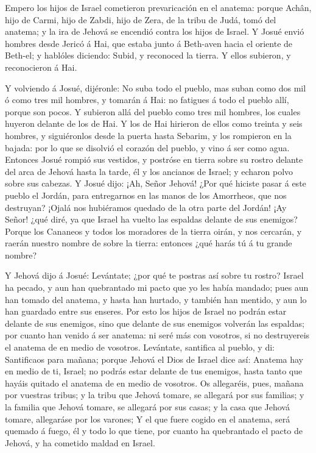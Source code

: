  Empero los hijos de Israel cometieron prevaricación en el
anatema: porque Achân, hijo de Carmi, hijo de Zabdi, hijo de Zera, de la
tribu de Judá, tomó del anatema; y la ira de Jehová se encendió contra
los hijos de Israel.  Y Josué envió hombres desde Jericó á
Hai, que estaba junto á Beth-aven hacia el oriente de Beth-el; y
hablóles diciendo: Subid, y reconoced la tierra. Y ellos subieron, y
reconocieron á Hai.

 Y volviendo á Josué, dijéronle: No suba todo el pueblo, mas
suban como dos mil ó como tres mil hombres, y tomarán á Hai: no fatigues
á todo el pueblo allí, porque son pocos.  Y subieron allá
del pueblo como tres mil hombres, los cuales huyeron delante de los de
Hai.  Y los de Hai hirieron de ellos como treinta y seis
hombres, y siguiéronlos desde la puerta hasta Sebarim, y los rompieron
en la bajada: por lo que se disolvió el corazón del pueblo, y vino á ser
como agua.  Entonces Josué rompió sus vestidos, y postróse
en tierra sobre su rostro delante del arca de Jehová hasta la tarde, él
y los ancianos de Israel; y echaron polvo sobre sus cabezas.
 Y Josué dijo: ¡Ah, Señor Jehová! ¿Por qué hiciste pasar á
este pueblo el Jordán, para entregarnos en las manos de los Amorrheos,
que nos destruyan? ¡Ojalá nos hubiéramos quedado de la otra parte del
Jordán!  ¡Ay Señor! ¿qué diré, ya que Israel ha vuelto las
espaldas delante de sus enemigos?  Porque los Cananeos y
todos los moradores de la tierra oirán, y nos cercarán, y raerán nuestro
nombre de sobre la tierra: entonces ¿qué harás tú á tu grande nombre?

 Y Jehová dijo á Josué: Levántate; ¿por qué te postras así
sobre tu rostro?  Israel ha pecado, y aun han quebrantado
mi pacto que yo les había mandado; pues aun han tomado del anatema, y
hasta han hurtado, y también han mentido, y aun lo han guardado entre
sus enseres.  Por esto los hijos de Israel no podrán estar
delante de sus enemigos, sino que delante de sus enemigos volverán las
espaldas; por cuanto han venido á ser anatema: ni seré más con vosotros,
si no destruyereis el anatema de en medio de vosotros. 
Levántate, santifica al pueblo, y di: Santificaos para mañana; porque
Jehová el Dios de Israel dice así: Anatema hay en medio de ti, Israel;
no podrás estar delante de tus enemigos, hasta tanto que hayáis quitado
el anatema de en medio de vosotros.  Os allegaréis, pues,
mañana por vuestras tribus; y la tribu que Jehová tomare, se allegará
por sus familias; y la familia que Jehová tomare, se allegará por sus
casas; y la casa que Jehová tomare, allegaráse por los varones;
 Y el que fuere cogido en el anatema, será quemado á fuego,
él y todo lo que tiene, por cuanto ha quebrantado el pacto de Jehová, y
ha cometido maldad en Israel.

